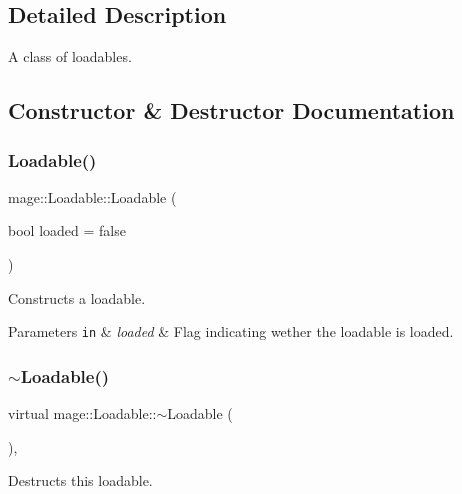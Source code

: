 \subsection{Detailed Description}
A class of loadables. 

\subsection{Constructor \& Destructor Documentation}
\hypertarget{classmage_1_1_loadable_afbdcb287b5e20583899a27a1c244bc7d}{}\label{classmage_1_1_loadable_afbdcb287b5e20583899a27a1c244bc7d} 
\subsubsection{\texorpdfstring{Loadable()}{Loadable()}}
{\footnotesize\ttfamily mage\+::\+Loadable\+::\+Loadable (\begin{DoxyParamCaption}\item[{bool}]{loaded = {\ttfamily false} }\end{DoxyParamCaption})\hspace{0.3cm}{\ttfamily [protected]}}

Constructs a loadable.


\begin{DoxyParams}[1]{Parameters}
\mbox{\tt in}  & {\em loaded} & Flag indicating wether the loadable is loaded. \\
\hline
\end{DoxyParams}
\hypertarget{classmage_1_1_loadable_a009ef5ebc9baf803b19110d937922b41}{}\label{classmage_1_1_loadable_a009ef5ebc9baf803b19110d937922b41} 
\subsubsection{\texorpdfstring{$\sim$\+Loadable()}{~Loadable()}}
{\footnotesize\ttfamily virtual mage\+::\+Loadable\+::$\sim$\+Loadable (\begin{DoxyParamCaption}{ }\end{DoxyParamCaption})\hspace{0.3cm}{\ttfamily [protected]}, {\ttfamily [virtual]}}

Destructs this loadable. 

